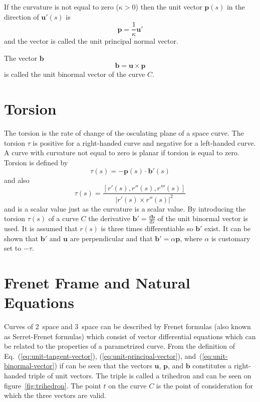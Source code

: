 If the curvature is not equal to zero ($\kappa > 0$) then the unit
vector $\mathbf{p}(s)$ in the direction of $\mathbf{u}'(s)$ is
\begin{equation}
  \label{eq:unit-principal-vector}
  \mathbf{p} = \frac{1}{\kappa}\mathbf{u}'
\end{equation}
and the vector is called the unit principal normal vector.

The vector $\mathbf{b}$ 
\begin{equation}
  \label{eq:unit-binormal-vector}
  \mathbf{b} = \mathbf{u} \times \mathbf{p}
\end{equation}
is called the unit binormal vector of the curve $C$. 

\section{Torsion}
\label{sec:torsion}

The torsion is the rate of change of the osculating plane of a space
curve. The torsion $\tau$ is positive for a right-handed curve and
negative for a left-handed curve. A curve with curvature not equal to
zero is planar if torsion is equal to zero. Torsion is defined by
\begin{equation}
  \label{eq:torsion}
  \tau(s) = -\mathbf{p}(s) \cdot \mathbf{b}'(s)
\end{equation}
and also
\begin{equation}
  \label{eq:real-torsion}
  \tau(s) = \frac{[r'(s),r''(s),r'''(s)]}{\lvert r'(s) \times r''(s) \rvert^2}
\end{equation}
and is a scalar value just as the curvature is a scalar value. By
introducing the torsion $\tau (s)$ of a curve $C$ the derivative
$\mathbf{b}' = \frac{d\mathbf{b}}{ds}$ of the unit binormal vector is
used. It is assumed that $r(s)$ is three times differentiable so
$\mathbf{b}'$ exist. It can be shown that $\mathbf{b}'$ and
$\mathbf{u}$ are perpendicular and that $\mathbf{b}' = \alpha
\mathbf{p}$, where $\alpha$ is customary set to $-\tau$.

\section{Frenet Frame and Natural Equations}
\label{sec:frenet-frame-natural-equations}

Curves of 2~space and 3~space can be described by Frenet formulas
(also known as Serret-Frenet formulas) which consist of vector
differential equations which can be related to the properties of a
parametrized curve.  From the definition of
Eq.~(\ref{eq:unit-tangent-vector}), (\ref{eq:unit-principal-vector}),
and~(\ref{eq:unit-binormal-vector}) if can be seen that the vectors
$\mathbf{u}$, $\mathbf{p}$, and $\mathbf{b}$ constitutes a
right-handed triple of unit vectors. The triple is called a trihedron
and can be seen on figure~\ref{fig:trihedron}. The point $t$ on the
curve $C$ is the point of consideration for which the three vectors
are valid.

